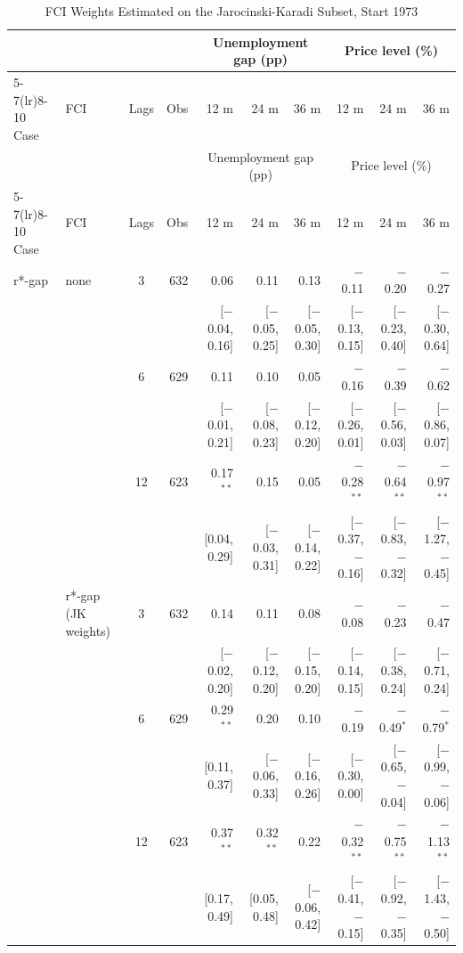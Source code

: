 \begingroup\scriptsize\setlength{\tabcolsep}{0.9pt}
\begin{longtable}{llcrrrrrrr}
\caption{FCI Weights Estimated on the Jarocinski-Karadi Subset, Start 1973}\label{tab:appR5c73}\\
\toprule
 & & & & \multicolumn{3}{c}{Unemployment gap (pp)} & \multicolumn{3}{c}{Price level (\%)}\\ \cmidrule(lr){5-7}\cmidrule(lr){8-10}
Case & FCI & Lags & Obs & 12 m & 24 m & 36 m & 12 m & 24 m & 36 m\\
\midrule\endfirsthead
\toprule
 & & & & \multicolumn{3}{c}{Unemployment gap (pp)} & \multicolumn{3}{c}{Price level (\%)}\\ \cmidrule(lr){5-7}\cmidrule(lr){8-10}
Case & FCI & Lags & Obs & 12 m & 24 m & 36 m & 12 m & 24 m & 36 m\\
\midrule\endhead
\bottomrule\endfoot
r*-gap & none & 3 & 632 & 0.06 & 0.11 & 0.13 & $-$0.11 & $-$0.20 & $-$0.27\\
 & & & & {\scriptsize [$-$0.04, 0.16]} & {\scriptsize [$-$0.05, 0.25]} & {\scriptsize [$-$0.05, 0.30]} & {\scriptsize [$-$0.13, 0.15]} & {\scriptsize [$-$0.23, 0.40]} & {\scriptsize [$-$0.30, 0.64]}\\
 &  & 6 & 629 & 0.11 & 0.10 & 0.05 & $-$0.16 & $-$0.39 & $-$0.62\\
 & & & & {\scriptsize [$-$0.01, 0.21]} & {\scriptsize [$-$0.08, 0.23]} & {\scriptsize [$-$0.12, 0.20]} & {\scriptsize [$-$0.26, 0.01]} & {\scriptsize [$-$0.56, 0.03]} & {\scriptsize [$-$0.86, 0.07]}\\
 &  & 12 & 623 & 0.17$^{**}$ & 0.15 & 0.05 & $-$0.28$^{**}$ & $-$0.64$^{**}$ & $-$0.97$^{**}$\\
 & & & & {\scriptsize [0.04, 0.29]} & {\scriptsize [$-$0.03, 0.31]} & {\scriptsize [$-$0.14, 0.22]} & {\scriptsize [$-$0.37, $-$0.16]} & {\scriptsize [$-$0.83, $-$0.32]} & {\scriptsize [$-$1.27, $-$0.45]}\\
 & r*-gap (JK weights) & 3 & 632 & 0.14 & 0.11 & 0.08 & $-$0.08 & $-$0.23 & $-$0.47\\
 & & & & {\scriptsize [$-$0.02, 0.20]} & {\scriptsize [$-$0.12, 0.20]} & {\scriptsize [$-$0.15, 0.20]} & {\scriptsize [$-$0.14, 0.15]} & {\scriptsize [$-$0.38, 0.24]} & {\scriptsize [$-$0.71, 0.24]}\\
 &  & 6 & 629 & 0.29$^{**}$ & 0.20 & 0.10 & $-$0.19 & $-$0.49$^{*}$ & $-$0.79$^{*}$\\
 & & & & {\scriptsize [0.11, 0.37]} & {\scriptsize [$-$0.06, 0.33]} & {\scriptsize [$-$0.16, 0.26]} & {\scriptsize [$-$0.30, 0.00]} & {\scriptsize [$-$0.65, $-$0.04]} & {\scriptsize [$-$0.99, $-$0.06]}\\
 &  & 12 & 623 & 0.37$^{**}$ & 0.32$^{**}$ & 0.22 & $-$0.32$^{**}$ & $-$0.75$^{**}$ & $-$1.13$^{**}$\\
 & & & & {\scriptsize [0.17, 0.49]} & {\scriptsize [0.05, 0.48]} & {\scriptsize [$-$0.06, 0.42]} & {\scriptsize [$-$0.41, $-$0.15]} & {\scriptsize [$-$0.92, $-$0.35]} & {\scriptsize [$-$1.43, $-$0.50]}\\
\end{longtable}

